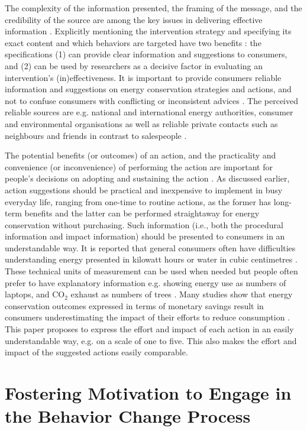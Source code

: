 \documentclass[a4paper]{article}
\begin{document}
The complexity of the information presented, the framing of the message, and the credibility of the source are among the key issues in delivering effective information \citep{Schultz2002}. Explicitly mentioning the intervention strategy and specifying its exact content and which behaviors are targeted have two benefits \citep{Abrahamse2005}: the specifications (1) can provide clear information and suggestions to consumers, and (2) can be used by researchers as a decisive factor in evaluating an intervention's (in)effectiveness. It is important to provide consumers reliable information and suggestions on energy conservation strategies and actions, and not to confuse consumers with conflicting or inconsistent advices \citep{CEER2015}. The perceived reliable sources are e.g. national and international energy authorities, consumer and environmental organisations \citep{CEER2015} as well as reliable private contacts such as neighbours and friends in contrast to salespeople \citep{Selvefors2015}.

The potential benefits (or outcomes) of an action, and the practicality and convenience (or inconvenience) of performing the action are important for people's decisions on adopting and sustaining the action \citep{Schultz2002,Claudy2013}. As discussed earlier, action suggestions should be practical and inexpensive to implement in busy everyday life, ranging from one-time to routine actions, as the former has long-term benefits and the latter can be performed straightaway for energy conservation without purchasing. Such information (i.e., both the procedural information and impact information) should be presented to consumers in an understandable way. It is reported that general consumers often have difficulties understanding energy presented in kilowatt hours or water in cubic centimetres \citep{Froehlich2009,+}. These technical units of measurement can be used when needed but people often prefer to have explanatory information e.g. showing energy use as numbers of laptops, and CO$_{2}$ exhaust as numbers of trees \citep{Petkov2011}. Many studies show that energy conservation outcomes expressed in terms of monetary savings result in consumers underestimating the impact of their efforts to reduce consumption \citep{Froehlich2009,Pierce2010,Abrahamse2013}. This paper proposes to express the effort and impact of each action in an easily understandable way, e.g. on a scale of one to five. This also makes the effort and impact of the suggested actions easily comparable. 


\section{Fostering Motivation to Engage in the Behavior Change Process}
\label{sec:motivation}
\end{document}
